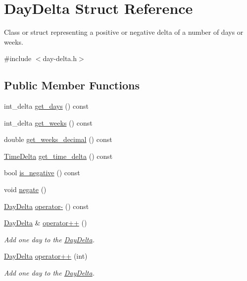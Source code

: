 \hypertarget{structDayDelta}{\section{\-Day\-Delta \-Struct \-Reference}
\label{structDayDelta}
}


\-Class or struct representing a positive or negative delta of a number of days or weeks.  




{\ttfamily \#include $<$day-\/delta.\-h$>$}

\subsection*{\-Public \-Member \-Functions}
\begin{DoxyCompactItemize}
\item 
int\-\_\-delta \hyperlink{structDayDelta_a59159b1d56a28b5f2a693979e4b280a1}{get\-\_\-days} () const 
\item 
int\-\_\-delta \hyperlink{structDayDelta_a2f4510044f51ebb61ffef942ee173de2}{get\-\_\-weeks} () const 
\item 
double \hyperlink{structDayDelta_a2e3251e65463940ef87d447d51948e05}{get\-\_\-weeks\-\_\-decimal} () const 
\item 
\hyperlink{structTimeDelta}{\-Time\-Delta} \hyperlink{structDayDelta_ab10777d5c043236aa613081d56317642}{get\-\_\-time\-\_\-delta} () const 
\item 
bool \hyperlink{structDayDelta_a10d6b9eac43322a957f7c3dfbedc2862}{is\-\_\-negative} () const 
\item 
void \hyperlink{structDayDelta_a23b9453556a255f5413aee21b12938a6}{negate} ()
\item 
\hyperlink{structDayDelta}{\-Day\-Delta} \hyperlink{structDayDelta_ab147a13f61362001a4acdaa1b782d1cf}{operator-\/} () const 
\item 
\hyperlink{structDayDelta}{\-Day\-Delta} \& \hyperlink{structDayDelta_aa0a78ca9d3a6a3241211e22d638e0323}{operator++} ()
\begin{DoxyCompactList}\small\item\em \-Add one day to the \hyperlink{structDayDelta}{\-Day\-Delta}. \end{DoxyCompactList}\item 
\hyperlink{structDayDelta}{\-Day\-Delta} \hyperlink{structDayDelta_a6f5ca65ca16018cdf39bd5543cbec127}{operator++} (int)
\begin{DoxyCompactList}\small\item\em \-Add one day to the \hyperlink{structDayDelta}{\-Day\-Delta}. \end{DoxyCompactList}\item 

\end{DoxyCompactItemize}
